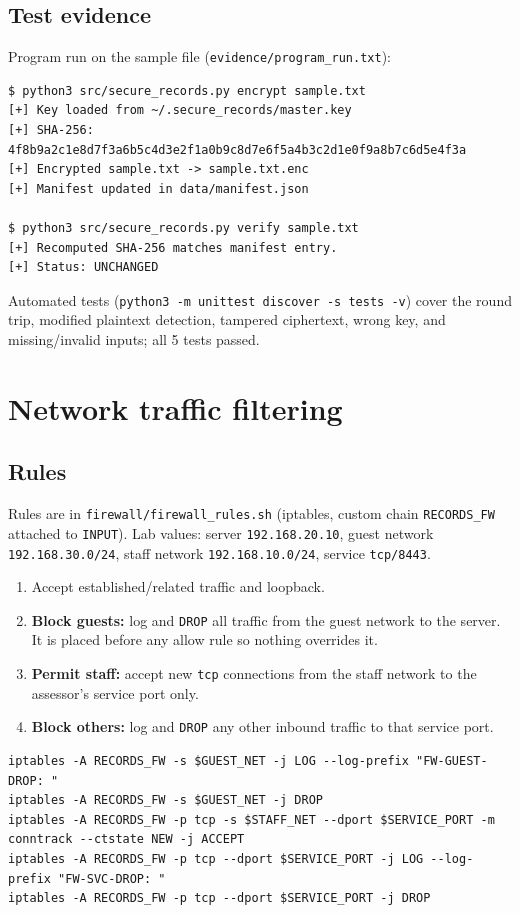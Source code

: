 \documentclass[11pt,a4paper]{article}
\begin{document}
\subsection{Test evidence}
Program run on the sample file (\texttt{evidence/program\_run.txt}):

\begin{lstlisting}
$ python3 src/secure_records.py encrypt sample.txt
[+] Key loaded from ~/.secure_records/master.key
[+] SHA-256: 4f8b9a2c1e8d7f3a6b5c4d3e2f1a0b9c8d7e6f5a4b3c2d1e0f9a8b7c6d5e4f3a
[+] Encrypted sample.txt -> sample.txt.enc
[+] Manifest updated in data/manifest.json

$ python3 src/secure_records.py verify sample.txt
[+] Recomputed SHA-256 matches manifest entry.
[+] Status: UNCHANGED
\end{lstlisting}

Automated tests (\texttt{python3 -m unittest discover -s tests -v}) cover the round trip, modified plaintext detection, tampered ciphertext, wrong key, and missing/invalid inputs; all 5 tests passed.

\section{Network traffic filtering}
\subsection{Rules}
Rules are in \texttt{firewall/firewall\_rules.sh} (iptables, custom chain \texttt{RECORDS\_FW} attached to \texttt{INPUT}). Lab values: server \texttt{192.168.20.10}, guest network \texttt{192.168.30.0/24}, staff network \texttt{192.168.10.0/24}, service \texttt{tcp/8443}.

\begin{enumerate}[nosep]
\item Accept established/related traffic and loopback.
\item \textbf{Block guests:} log and \texttt{DROP} all traffic from the guest network to the server. It is placed before any allow rule so nothing overrides it.
\item \textbf{Permit staff:} accept new \texttt{tcp} connections from the staff network to the assessor's service port only.
\item \textbf{Block others:} log and \texttt{DROP} any other inbound traffic to that service port.
\end{enumerate}

\begin{lstlisting}
iptables -A RECORDS_FW -s $GUEST_NET -j LOG --log-prefix "FW-GUEST-DROP: "
iptables -A RECORDS_FW -s $GUEST_NET -j DROP
iptables -A RECORDS_FW -p tcp -s $STAFF_NET --dport $SERVICE_PORT -m conntrack --ctstate NEW -j ACCEPT
iptables -A RECORDS_FW -p tcp --dport $SERVICE_PORT -j LOG --log-prefix "FW-SVC-DROP: "
iptables -A RECORDS_FW -p tcp --dport $SERVICE_PORT -j DROP
\end{lstlisting}
\end{document}

